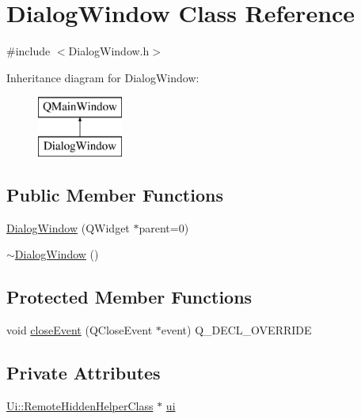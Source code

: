 \hypertarget{class_dialog_window}{}\section{Dialog\+Window Class Reference}
\label{class_dialog_window}


{\ttfamily \#include $<$Dialog\+Window.\+h$>$}

Inheritance diagram for Dialog\+Window\+:\begin{figure}[H]
\begin{center}
\leavevmode
\includegraphics[height=2.000000cm]{class_dialog_window}
\end{center}
\end{figure}
\subsection*{Public Member Functions}
\begin{DoxyCompactItemize}
\item 
\hyperlink{class_dialog_window_a5947ec9e71ed3782211f6d81dd696b21}{Dialog\+Window} (Q\+Widget $\ast$parent=0)
\item 
\hyperlink{class_dialog_window_a59d3601f7622f31ef928377fc1789eda}{$\sim$\+Dialog\+Window} ()
\end{DoxyCompactItemize}
\subsection*{Protected Member Functions}
\begin{DoxyCompactItemize}
\item 
void \hyperlink{class_dialog_window_a4ebb65eafbab8384d0064ad8a0e9c6dd}{close\+Event} (Q\+Close\+Event $\ast$event) Q\+\_\+\+D\+E\+C\+L\+\_\+\+O\+V\+E\+R\+R\+I\+DE
\end{DoxyCompactItemize}
\subsection*{Private Attributes}
\begin{DoxyCompactItemize}
\item 
\hyperlink{class_ui_1_1_remote_hidden_helper_class}{Ui\+::\+Remote\+Hidden\+Helper\+Class} $\ast$ \hyperlink{class_dialog_window_ace4feb50f11737df8753b57b936d8fe2}{ui}
\end{DoxyCompactItemize}


